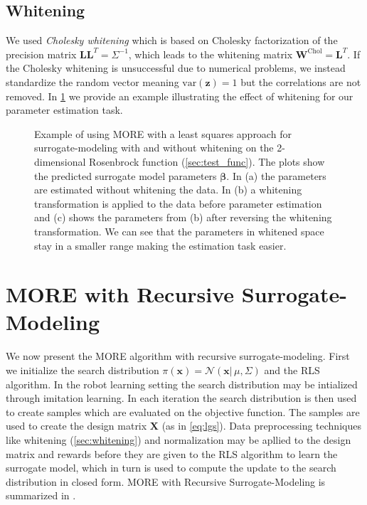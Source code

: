 %
%
%
%
\subsection{Whitening}
We used \textit{Cholesky whitening} which is based on
Cholesky factorization of the precision matrix
$\mathbf{L}\mathbf{L}^T = \Sigma^{-1}$, which leads to the whitening
matrix $\mathbf{W}^{\text{Chol}} = \mathbf{L}^T$.
If the Cholesky whitening is unsuccessful due to numerical problems,
we instead standardize
the random vector meaning $\text{var}(\mathbf{z}) = 1$ but the correlations
are not removed.
In \cref{fig:whitening} we provide an example illustrating the effect of 
whitening for our parameter estimation task.

\begin{figure}[t]
  \centering
  \caption{\small
    Example of using MORE with a least squares approach for
    surrogate-modeling with and without whitening on the 2-dimensional
    Rosenbrock function (\cref{sec:test_func}).
    The plots show the predicted surrogate model
    parameters $\mathbf{\beta}$. In (a) the parameters are estimated
    without whitening the data. In (b) a whitening transformation is
    applied to the data before parameter estimation
    and (c) shows the parameters from (b) after reversing
    the whitening transformation.
    We can see that the parameters in whitened space
    stay in a smaller range 
    making the estimation task easier.}
 \label{fig:whitening}
\end{figure}


\section{MORE with Recursive Surrogate-Modeling}
We now present the MORE algorithm with recursive surrogate-modeling.
First we initialize the search distribution 
$\pi(\mathbf{x}) = \mathcal{N}(\mathbf{x} |\, \mu, \Sigma)$ and
the RLS algorithm. In the robot
learning setting the search distribution may be intialized
through imitation learning.
In each iteration the search distribution is then used to create
samples which are evaluated on the objective function.
The samples are used to create the design matrix $\mathbf{X}$
(as in \ref{eq:lgs}).
Data preprocessing techniques like whitening (\cref{sec:whitening})
and normalization
may be apllied to the design matrix and rewards before they
are given to the RLS algorithm to learn the surrogate model, which in turn
is used to compute the update to the search distribution in closed form.
MORE with Recursive Surrogate-Modeling is summarized in .

